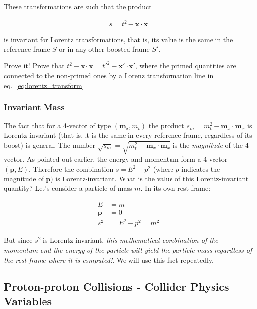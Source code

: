 These transformations are such that the product 

\begin{align*}
s = t^2 - \mathbf{x} \cdot \mathbf{x}
\end{align*}

\noindent is invariant for Lorentz transformations, that is, its value is the same in the reference frame $S$ or in any other boosted frame $S'$. 

\begin{mybox}
\begin{ExerciseList}
\Exercise Prove it! Prove that  $t^2 - \mathbf{x} \cdot \mathbf{x} =  t'^2 - \mathbf{x'} \cdot \mathbf{x'}$, where the primed quantities are connected to the non-primed ones by a Lorenz transformation line in eq.~\ref{eq:lorentz_transform}
\end{ExerciseList}
\end{mybox}

\subsubsection{Invariant Mass}
\label{sec:invariant_mass}

The fact that for a 4-vector of type $\left(\mathbf{m}_x, m_t\right)$ the product $s_{m} = m_t^2 - \mathbf{m}_x \cdot \mathbf{m}_x$ is Lorentz-invariant (that is, it is the same in every reference frame, regardless of its boost) is general. The number $\sqrt{s_{m}} = \sqrt{m_t^2 - \mathbf{m}_x \cdot \mathbf{m}_x}$ is the \textit{magnitude} of the 4-vector. As pointed out earlier, the energy and momentum form a 4-vector $\left(\mathbf{p},E\right)$. Therefore the combination $s = E^2-p^2$ (where $p$ indicates the magnitude of $\mathbf{p}$) is Lorentz-invariant. What is the value of this Lorentz-invariant quantity? Let's consider a particle of mass $m$. In its own rest frame: 

\begin{align*} 
E &= m \\ 
\mathbf{p} &= 0 \\ 
s^2 &= E^2 - p^2 = m^2
\end{align*}

\noindent But since $s^2$ is Lorentz-invariant, \textit{this mathematical combination of the momentum and the energy of the particle will yield the particle mass regardless of the rest frame where it is computed!}. We will use this fact repeatedly.

\subsection{Proton-proton Collisions - Collider Physics Variables}
\label{sec:collider_physics_variables}

